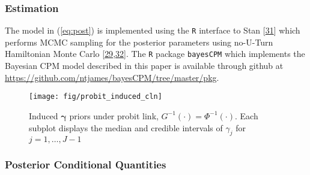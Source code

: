 \documentclass[
]{article}
\begin{document}
\hypertarget{estimation}{%
\subsubsection{Estimation}\label{estimation}}

The model in (\ref{eq:post}) is implemented using the \texttt{R} interface to Stan {[}\protect\hyperlink{ref-stan_development_team_rstan:_2018}{31}{]} which performs MCMC sampling for the posterior parameters using no-U-Turn Hamiltonian Monte Carlo {[}\protect\hyperlink{ref-gelman_bayesian_2014}{29},\protect\hyperlink{ref-neal_mcmc_2011}{32}{]}. The \texttt{R} package \texttt{bayesCPM} which implements the Bayesian CPM model described in this paper is available through github at \url{https://github.com/ntjames/bayesCPM/tree/master/pkg}.

\begin{figure}

{\centering \texttt{[image: fig/probit\_induced\_cln]} 

}

\caption{Induced $\boldsymbol{\gamma}$ priors under probit link, $G^{-1}(\cdot)=\Phi^{-1}(\cdot)$. Each subplot displays the median and credible intervals of $\gamma_j$ for $j=1,\ldots,J-1$}\label{fig:probit-induced}
\end{figure}

\hypertarget{posterior-conditional-quantities}{%
\subsubsection{Posterior Conditional Quantities}\label{posterior-conditional-quantities}}
\end{document}
